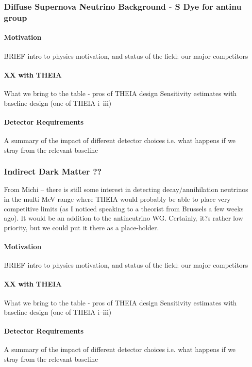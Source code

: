 \documentclass[11pt,prd,letterpaper,amsmath,amssymb,final,nofootinbib
,unsortedaddress,superscriptaddress
]{revtex4-1}
\begin{document}
\subsubsection{Diffuse Supernova Neutrino Background - S Dye for antinu group}
\paragraph{Motivation}
BRIEF intro to physics motivation, and status of the field: our major competitors
\paragraph{XX with THEIA}
What we bring to the table - pros of THEIA design \newline
Sensitivity estimates with baseline design (one of THEIA i--iii)
\paragraph{Detector Requirements}
A summary of the impact of different detector choices i.e. what happens if we stray from the relevant baseline
\subsubsection{Indirect Dark Matter ?? }
From Michi -- there is still some interest in detecting decay/annihilation neutrinos in the multi-MeV range where THEIA would probably be able to place very competitive limits (as I noticed speaking to a theorist from Brussels a few weeks ago). It would be an addition to the antineutrino WG. Certainly, it?s rather low priority, but we could put it there as a place-holder.
\paragraph{Motivation}
BRIEF intro to physics motivation, and status of the field: our major competitors
\paragraph{XX with THEIA}
What we bring to the table - pros of THEIA design \newline
Sensitivity estimates with baseline design (one of THEIA i--iii)
\paragraph{Detector Requirements}
A summary of the impact of different detector choices i.e. what happens if we stray from the relevant baseline
\end{document}
